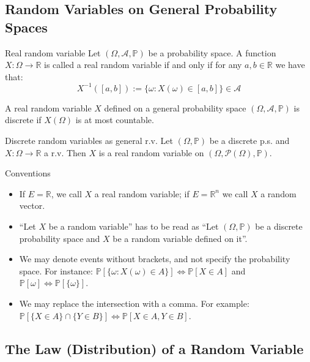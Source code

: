 \documentclass[11pt, a4paper]{article}
\begin{document}
\subsection{Random Variables on General Probability Spaces}

\begin{definition}{Real random variable}{}
Let $(\Omega, \mathscr{A}, \mathbb{P})$ be a probability space. A function $X: \Omega \rightarrow \mathbb{R}$ is called a real random variable if and only if for any $a, b \in \mathbb{R}$ we have that:
\[X^{-1}([a,b]) := \{\omega : X(\omega) \in [a,b]\} \in \mathscr{A}\]

A real random variable $X$ defined on a general probability space $(\Omega, \mathscr{A}, \mathbb{P})$ is discrete if $X(\Omega)$ is at most countable.
\end{definition}

\begin{proposition}{Discrete random variables as general r.v.}{}
Let $(\Omega, \mathbb{P})$ be a discrete p.s. and $X: \Omega \rightarrow \mathbb{R}$ a r.v. Then $X$ is a real random variable on $(\Omega, \mathcal{P}(\Omega), \mathbb{P})$.
\end{proposition}

\begin{remark}{Conventions}{}
\begin{itemize}
    \item If $E = \mathbb{R}$, we call $X$ a real random variable; if $E = \mathbb{R}^n$ we call $X$ a random vector.
    \item ``Let $X$ be a random variable'' has to be read as ``Let $(\Omega, \mathbb{P})$ be a discrete probability space and $X$ be a random variable defined on it''.
    \item We may denote events without brackets, and not specify the probability space. For instance: $\mathbb{P}[\{\omega : X(\omega) \in A\}] \Leftrightarrow \mathbb{P}[X \in A]$ and $\mathbb{P}[\omega] \Leftrightarrow \mathbb{P}[\{\omega\}]$.
    \item We may replace the intersection with a comma. For example: $\mathbb{P}[\{X \in A\} \cap \{Y \in B\}] \Leftrightarrow \mathbb{P}[X \in A, Y \in B]$.
\end{itemize}
\end{remark}

\subsection{The Law (Distribution) of a Random Variable}
\end{document}
